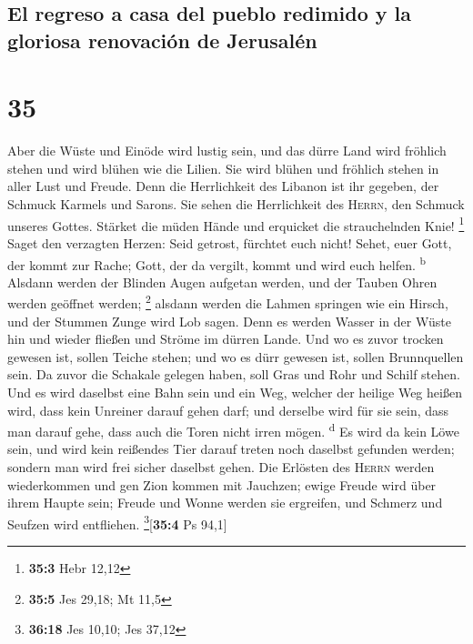 \hypertarget{el-regreso-a-casa-del-pueblo-redimido-y-la-gloriosa-renovaciuxf3n-de-jerusaluxe9n}{%
\subsection{El regreso a casa del pueblo redimido y la gloriosa
renovación de
Jerusalén}\label{el-regreso-a-casa-del-pueblo-redimido-y-la-gloriosa-renovaciuxf3n-de-jerusaluxe9n}}

\hypertarget{section-34}{%
\section{35}\label{section-34}}

 Aber die Wüste und Einöde wird lustig sein, und das dürre
Land wird fröhlich stehen und wird blühen wie die Lilien. 
Sie wird blühen und fröhlich stehen in aller Lust und Freude. Denn die
Herrlichkeit des Libanon ist ihr gegeben, der Schmuck Karmels und
Sarons. Sie sehen die Herrlichkeit des \textsc{Herrn}, den Schmuck
unseres Gottes.  Stärket die müden Hände und erquicket die
strauchelnden Knie! \footnote{\textbf{35:3} Hebr 12,12} 
Saget den verzagten Herzen: Seid getrost, fürchtet euch nicht! Sehet,
euer Gott, der kommt zur Rache; Gott, der da vergilt, kommt und wird
euch helfen. \textsuperscript{b}  Alsdann werden der
Blinden Augen aufgetan werden, und der Tauben Ohren werden geöffnet
werden; \footnote{\textbf{35:5} Jes 29,18; Mt 11,5} 
alsdann werden die Lahmen springen wie ein Hirsch, und der Stummen Zunge
wird Lob sagen. Denn es werden Wasser in der Wüste hin und wieder
fließen und Ströme im dürren Lande.  Und wo es zuvor
trocken gewesen ist, sollen Teiche stehen; und wo es dürr gewesen ist,
sollen Brunnquellen sein. Da zuvor die Schakale gelegen haben, soll Gras
und Rohr und Schilf stehen.  Und es wird daselbst eine
Bahn sein und ein Weg, welcher der heilige Weg heißen wird, dass kein
Unreiner darauf gehen darf; und derselbe wird für sie sein, dass man
darauf gehe, dass auch die Toren nicht irren mögen. \textsuperscript{d}
 Es wird da kein Löwe sein, und wird kein reißendes Tier
darauf treten noch daselbst gefunden werden; sondern man wird frei
sicher daselbst gehen.  Die Erlösten des \textsc{Herrn}
werden wiederkommen und gen Zion kommen mit Jauchzen; ewige Freude wird
über ihrem Haupte sein; Freude und Wonne werden sie ergreifen, und
Schmerz und Seufzen wird entfliehen. \footnote{\textbf{36:18} Jes 10,10;
  Jes 37,12}{[}\textbf{35:4} Ps 94,1{]}

